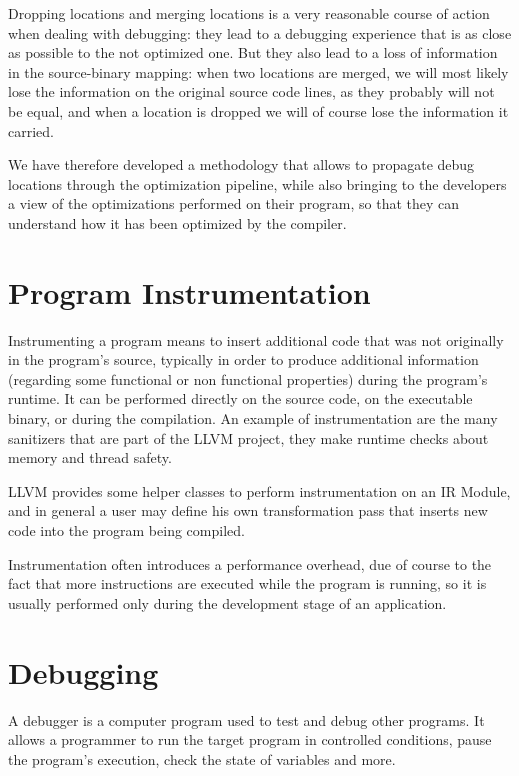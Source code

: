 Dropping locations and merging locations is a very reasonable course of action when dealing with debugging: they lead to a debugging experience that is as close as possible to the not optimized one. But they also lead to a loss of information in the source-binary mapping: when two locations are merged, we will most likely lose the information on the original source code lines, as they probably will not be equal, and when a location is dropped we will of course lose the information it carried.\par
We have therefore developed a methodology that allows to propagate debug locations through the optimization pipeline, while also bringing to the developers a view of the optimizations performed on their program, so that they can understand how it has been optimized by the compiler.

\section{Program Instrumentation}
Instrumenting a program means to insert additional code that was not originally in the program's source, typically in order to produce additional information (regarding some functional or non functional properties) during the program's runtime. It can be performed directly on the source code, on the executable binary, or during the compilation.
An example of instrumentation are the many sanitizers that are part of the LLVM project, they make runtime checks about memory and thread safety. \par 
LLVM provides some helper classes to perform instrumentation on an IR Module, and in general a user may define his own transformation pass that inserts new code into the program being compiled.
\par
Instrumentation often introduces a performance overhead, due of course to the fact that more instructions are executed while the program is running, so it is usually performed only during the development stage of an application.


\section{Debugging}
A debugger is a computer program used to test and debug other programs. It allows a programmer to run the target program in controlled conditions, pause the program's execution, check the state of variables and more.

